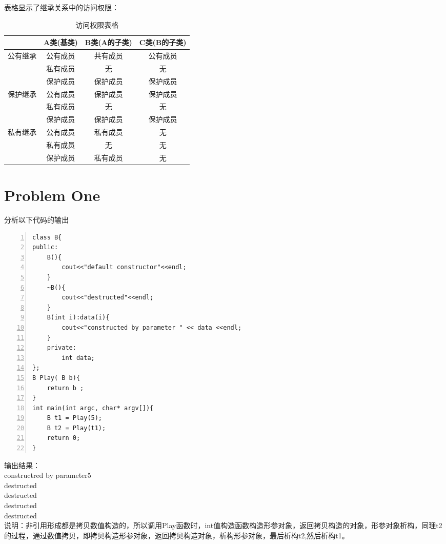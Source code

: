 表格显示了继承关系中的访问权限：\\
	\begin{table}[htbp]
		\caption{访问权限表格}
		\centering
		\begin{tabular}{cccc}
			\toprule
			&A类(基类)&B类(A的子类)&C类(B的子类)\\
			\midrule
			\multirow{3}{*}{\centering 公有继承}&公有成员&共有成员&公有成员\\
			&私有成员&无&无\\
			&保护成员&保护成员&保护成员\\
			\midrule
			\multirow{3}{*}{\centering 保护继承}&公有成员&保护成员&保护成员\\
			&私有成员&无&无\\
			&保护成员&保护成员&保护成员\\
			\midrule
			\multirow{3}{*}{\centering 私有继承}&公有成员&私有成员&无\\
			&私有成员&无&无\\
			&保护成员&私有成员&无\\
			\bottomrule
		\end{tabular}
	\end{table}

\section{Problem One}
分析以下代码的输出
\begin{lstlisting}[language={[ANSI]C},numbers=left,numberstyle=\tiny,%frame=shadowbox,
   rulesepcolor=\color{red!20!green!20!blue!20},
   keywordstyle=\color{blue!70!black},
   commentstyle=\color{blue!90!},
   basicstyle=\ttfamily]
class B{
public:
	B(){
		cout<<"default constructor"<<endl;
	}
	~B(){
		cout<<"destructed"<<endl;
	}
	B(int i):data(i){
		cout<<"constructed by parameter " << data <<endl;
	}
	private:
		int data;
};
B Play( B b){
	return b ;
}
int main(int argc, char* argv[]){                                     
	B t1 = Play(5); 
	B t2 = Play(t1);   　 
	return 0; 　　　　　　　　　　　　　　 
}
\end{lstlisting}
输出结果：\\
constructred by parameter5 \\
destructed \\
destructed \\
destructed \\
destructed \\

说明：非引用形成都是拷贝数值构造的，所以调用Play函数时，int值构造函数构造形参对象，返回拷贝构造的对象，形参对象析构，同理t2的过程，通过数值拷贝，即拷贝构造形参对象，返回拷贝构造对象，析构形参对象，最后析构t2,然后析构t1。

